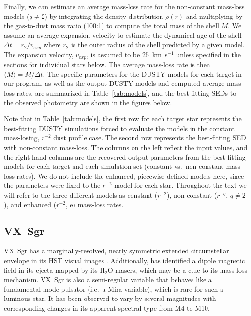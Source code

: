 \documentclass[modern]{aastex61}
\begin{document}
Finally, we can estimate an average mass-loss rate for the non-constant mass-loss models ($q\neq2$) by integrating the density distribution $\rho\left(r\right)$ and multiplying by the gas-to-dust mass ratio (100:1) to compute the total mass of the shell $M$.  We assume an average expansion velocity to estimate the dynamical age of the shell $\Delta t=r_2/v_{exp}$ where $r_2$ is the outer radius of the shell predicted by a given model. The expansion velocity, $v_{exp}$, is assumed to be 25~km~s$^{-1}$ unless specified in the sections for individual stars below. The average mass-loss rate is then $\langle\dot{M}\rangle=M/\Delta t$. The specific parameters for the DUSTY models for each target in our program, as well as the output DUSTY models and computed average mass-loss rates, are summarized in Table~\ref{tab:models}, and the best-fitting SEDs to the observed photometry are shown in the figures below.

Note that in Table~\ref{tab:models}, the first row for each target star represents the best-fitting DUSTY simulations forced to evaluate the models in the constant mass-losing, $r^{-2}$ dust profile case.  The second row represents the best-fitting SED with non-constant mass-loss.  The columns on the left reflect the input values, and the right-hand columns are the recovered output parameters from the best-fitting models for each target and each simulation set (constant vs.\ non-constant mass-loss rates). We do not include the enhanced, piecewise-defined models here, since the parameters were fixed to the $r^{-2}$ model for each star.  Throughout the text we will refer to the three different models as constant ($r^{-2}$), non-constant ($r^{-q},\,q\neq2$), and enhanced ($r^{-2}$, e) mass-loss rates.



\subsection{VX~Sgr}
VX~Sgr has a marginally-resolved, nearly symmetric extended circumstellar envelope in its HST visual images \citep{schuster2006}. Additionally, \cite{vlemmings2005} has identified a dipole magnetic field in its ejecta mapped by its H$_{2}$O masers, which may be a clue to its mass loss mechanism.  VX~Sgr is also a semi-regular variable that behaves like a fundamental mode pulsator (i.e.\ a Mira variable), which is rare for such a luminous star. It has been observed to vary by several magnitudes with corresponding changes in its apparent spectral type from M4 to M10.
\end{document}
